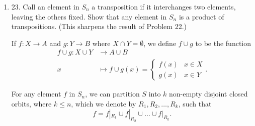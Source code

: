 \begin{enumerate}[resume]
\begin{proof}[Proof of (b), simpler]
\end{proof}
	\item 23. Call an element in $S_{n}$ a transposition if it interchanges two elements, leaving the others fixed. Show that any element in $S_{n}$ is a product of transpositions. (This sharpens the result of Problem 22.)
	\begin{definition}
		If $f: X\to A$ and $g:Y \to B$ where $X \cap Y = \emptyset$, we define $f \cup g $ to be the function
		\begin{align*}
			f \cup g : X \cup Y  &\longrightarrow A \cup B  \\
			x  &\longmapsto f \cup g (x ) = \begin{cases}
				f(x) & x \in X\\
				g(x) & x \in Y
			\end{cases}
		.\end{align*}
		
	\end{definition}
	\begin{lemma}
	For any element $f$ in $S_{n}$, we can partition $S$ into $k$ non-empty disjoint closed orbits, where $k\le  n$, which we denote by  $R_1, R_2, \ldots, R_{k}$, such that \[
	f = f|_{R_1} \cup f|_{R_2} \cup\ldots \cup f|_{R_k}
	.\] 
		

\end{lemma}
\end{enumerate}
